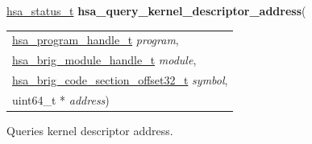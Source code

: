 \documentclass[final]{book}
\newcommand{\hsaarg}[1]{\textit{#1}}
\begin{document}
\begin{appendices}
\noindent\begin{tcolorbox}[breakable,nobeforeafter,colframe=white,colback=lightgray,left=0mm]
\hyperlink{group--status-1gad755322e7ff95456520e8abdbe90d225}{hsa_status_t} \hypertarget{group--HsailLinkerServiceLayer-1ga8f03cf00855637e02a7cd330a3f59bd9}{\textbf{hsa_query_kernel_descriptor_address}}(
\vspace{-3.5mm}\begin{longtable}{@{}p{\textwidth}}
\hspace{1.7em}\hyperlink{group--HsailLinkerServiceLayer-1ga7b28ca39da981be49aac99608eb386cb}{hsa_program_handle_t} \hsaarg{program},\\
\hspace{1.7em}\hyperlink{group--FinalizerCoreApi-1gafaea8b9ab368c499b58375f02f4b178b}{hsa_brig_module_handle_t} \hsaarg{module},\\
\hspace{1.7em}\hyperlink{group--FinalizerCoreApi-1ga975ce5cee53438ed8dc078f3e1dfbc04}{hsa_brig_code_section_offset32_t} \hsaarg{symbol},\\
\hspace{1.7em}uint64_t * \hsaarg{address})\end{longtable}

\end{tcolorbox}
Queries kernel descriptor address.


\end{appendices}
\end{document}
